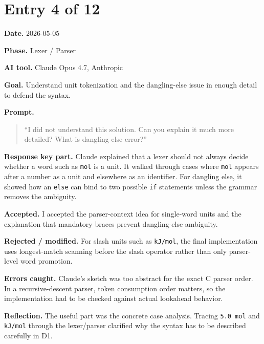 \documentclass[11pt,a4paper]{article}
\newcommand{\code}[1]{\texttt{#1}}
\newcommand{\field}[2]{\textbf{#1.} #2\par}
\newcommand{\prompt}[1]{%
  \textbf{Prompt.}
  \begin{quote}\small #1\end{quote}
}
\begin{document}
\section{Entry 4 of 12}
\field{Date}{2026-05-05}
\field{Phase}{Lexer / Parser}
\field{AI tool}{Claude Opus 4.7, Anthropic}
\field{Goal}{Understand unit tokenization and the dangling-else issue in enough detail to defend the syntax.}
\prompt{``I did not understand this solution. Can you explain it much more detailed? What is dangling else error?''}
\field{Response key part}{Claude explained that a lexer should not always decide whether a word such as \code{mol} is a unit. It walked through cases where \code{mol} appears after a number as a unit and elsewhere as an identifier. For dangling else, it showed how an \code{else} can bind to two possible \code{if} statements unless the grammar removes the ambiguity.}
\field{Accepted}{I accepted the parser-context idea for single-word units and the explanation that mandatory braces prevent dangling-else ambiguity.}
\field{Rejected / modified}{For slash units such as \code{kJ/mol}, the final implementation uses longest-match scanning before the slash operator rather than only parser-level word promotion.}
\field{Errors caught}{Claude's sketch was too abstract for the exact C parser order. In a recursive-descent parser, token consumption order matters, so the implementation had to be checked against actual lookahead behavior.}
\field{Reflection}{The useful part was the concrete case analysis. Tracing \code{5.0 mol} and \code{kJ/mol} through the lexer/parser clarified why the syntax has to be described carefully in D1.}
\end{document}
